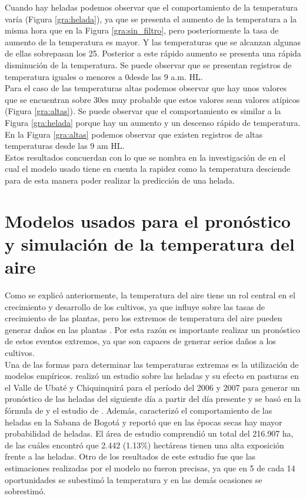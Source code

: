 Cuando hay heladas podemos observar que el comportamiento de la temperatura varía (Figura \ref{gra:helada}), ya que se presenta el aumento de la temperatura a la misma hora que en la Figura \ref{gra:sin_filtro}, pero posteriormente la tasa de aumento de la temperatura es mayor. Y las temperaturas que se alcanzan algunas de ellas sobrepasan los 25\celsius. Posterior a este rápido aumento se presenta una rápida disminución de la temperatura. Se puede observar que se presentan registros de temperatura iguales o menores a 0\celsius desde las 9 a.m. HL.\\

Para el caso de las temperaturas altas podemos observar que hay unos valores que se encuentran sobre 30\celsius es muy probable que estos valores sean valores atípicos (Figura \ref{gra:altas}). Se puede observar que el comportamiento es similar a la Figura \ref{gra:helada} porque hay un aumento y un descenso rápido de temperatura. En la Figura \ref{gra:altas} podemos observar que existen registros de altas temperaturas desde las 9 am HL.\\

Estos resultados concuerdan con lo que se nombra en la investigación de \citep{Gomez2014} en el cual el modelo usado tiene en cuenta la rapidez como la temperatura desciende para de esta manera poder realizar la predicción de una helada.


\section{Modelos usados para el pronóstico y simulación de la temperatura del aire}

Como se explicó anteriormente, la temperatura del aire tiene un rol central en el crecimiento y desarrollo de los cultivos, ya que influye sobre las tasas de crecimiento de las plantas, pero los extremos de temperatura del aire pueden generar daños en las plantas \citep{wheeler2000}. Por esta razón es importante realizar un pronóstico de estos eventos extremos, ya que son capaces de generar serios daños a los cultivos.\\

Una de las formas para determinar las temperaturas extremas es la utilización de modelos empíricos. \citet{Gomez2014} realizó un estudio sobre las heladas y su efecto en pasturas en el Valle de Ubaté y Chiquinquirá para el período del 2006 y 2007 para generar un pronóstico de las heladas del siguiente día a partir del día presente y se basó en la fórmula de \citet{Allen1957} y el estudio de \citet{Snyder2010}. Además, caracterizó el comportamiento de las heladas en la Sabana de Bogotá y reportó que en las épocas secas hay mayor probabilidad de heladas. El área de estudio comprendió un total del 216.907 ha, de las cuáles \citet{Gomez2014} encontró que 2.442 (1.13\%) hectáreas tienen una alta exposición frente a las heladas. Otro de los resultados de este estudio fue que las estimaciones realizadas por el modelo no fueron precisas, ya que en 5 de cada 14 oportunidades se subestimó la temperatura y en las demás ocasiones se sobrestimó.\\

